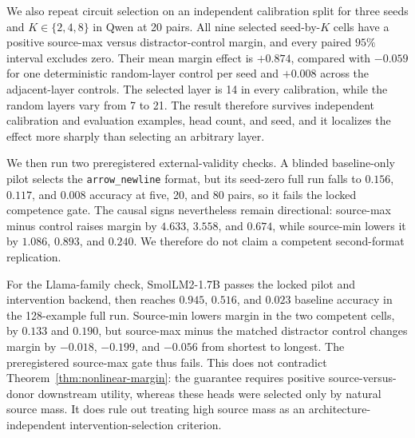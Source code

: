 \documentclass[letterpaper]{article} %
\begin{document}
We also repeat circuit selection on an independent calibration split for three seeds and
$K\in\{2,4,8\}$ in Qwen at 20 pairs.
All nine selected seed-by-$K$ cells have a positive source-max versus distractor-control margin, and every
paired $95\%$ interval excludes zero.
Their mean margin effect is $+0.874$, compared with $-0.059$ for one deterministic random-layer control per
seed and $+0.008$ across the adjacent-layer controls.
The selected layer is 14 in every calibration, while the random layers vary from 7 to 21.
The result therefore survives independent calibration and evaluation examples, head count, and seed, and
it localizes the effect more sharply than selecting an arbitrary layer.

We then run two preregistered external-validity checks. A blinded baseline-only pilot selects the
\texttt{arrow\_newline} format, but its seed-zero full run falls to $0.156$, $0.117$, and $0.008$ accuracy at
five, 20, and 80 pairs, so it fails the locked competence gate. The causal signs nevertheless remain
directional: source-max minus control raises margin by $4.633$, $3.558$, and $0.674$, while source-min lowers
it by $1.086$, $0.893$, and $0.240$. We therefore do not claim a competent second-format replication.

For the Llama-family check, SmolLM2-1.7B passes the locked pilot and intervention backend, then reaches
$0.945$, $0.516$, and $0.023$ baseline accuracy in the 128-example full run. Source-min lowers margin in the
two competent cells, by $0.133$ and $0.190$, but source-max minus the matched distractor control changes
margin by $-0.018$, $-0.199$, and $-0.056$ from shortest to longest. The preregistered source-max gate thus
fails. This does not contradict Theorem~\ref{thm:nonlinear-margin}: the guarantee requires positive
source-versus-donor downstream utility, whereas these heads were selected only by natural source mass. It
does rule out treating high source mass as an architecture-independent intervention-selection criterion.
\end{document}
